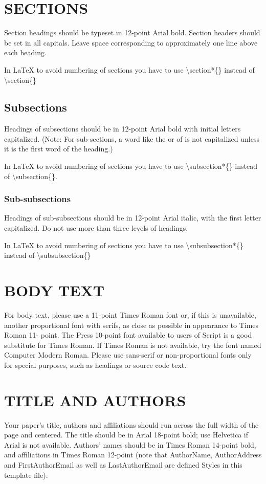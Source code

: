 \documentclass[11pt]{article}
\begin{document}
\section*{SECTIONS}
Section headings should be typeset in 12-point Arial bold. Section headers should be set
in all capitals. Leave space corresponding to approximately one line above each heading.

In LaTeX to avoid numbering of sections you have to use \textbackslash section*\{\} instead of \textbackslash section\{\}
\subsection*{Subsections}
Headings of subsections should be in 12-point Arial bold with initial letters capitalized.
(Note: For sub-sections, a word like the or of is not capitalized unless it is the first word
of the heading.)

In LaTeX to avoid numbering of sections you have to use \textbackslash subsection*\{\} instead of \textbackslash subsection\{\}.
\subsubsection*{Sub-subsections}
Headings of sub-subsections should be in 12-point Arial italic, with the first letter
capitalized. Do not use more than three levels of headings. 

In LaTeX to avoid numbering of sections you have to use \textbackslash subsubsection*\{\} instead of \textbackslash subsubsection\{\}
\section*{BODY TEXT}
For body text, please use a 11-point Times Roman font or, if this is unavailable, another
proportional font with serifs, as close as possible in appearance to Times Roman 11-
point. The Press 10-point font available to users of Script is a good substitute for Times
Roman. If Times Roman is not available, try the font named Computer Modern Roman.
Please use sans-serif or non-proportional fonts only for special purposes, such as
headings or source code text. 

\section*{TITLE AND AUTHORS}
Your paper's title, authors and affiliations should run across the full width of the page
and centered. The title should be in Arial 18-point bold; use Helvetica if Arial is not
available. Authors' names should be in Times Roman 14-point bold, and affiliations in
Times Roman 12-point (note that AuthorName, AuthorAddress and FirstAuthorEmail as
well as LastAuthorEmail are defined Styles in this template file).
\end{document}
